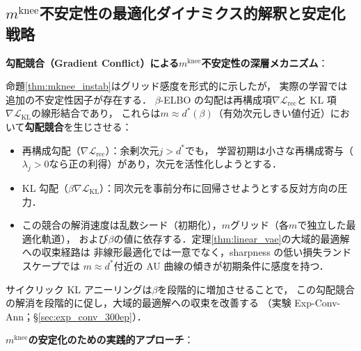 \documentclass[11pt,a4paper]{jsarticle}
\newcommand{\mknee}{m^{\mathrm{knee}}}
\begin{document}
\subsection{$\mknee$不安定性の最適化ダイナミクス的解釈と安定化戦略}\label{sec:disc_mknee_improve}

\textbf{勾配競合（Gradient Conflict）による$\mknee$不安定性の深層メカニズム}：

命題\ref{thm:mknee_instab}はグリッド感度を形式的に示したが，
実際の学習では追加の不安定性因子が存在する．
$\beta$-ELBO の勾配は再構成項$\nabla\mathcal{L}_\mathrm{rec}$と
KL 項$\nabla\mathcal{L}_\mathrm{KL}$の線形結合であり，
これらは$m \approx d^*(\beta)$（有効次元しきい値付近）において\textbf{勾配競合}を生じさせる：

\begin{itemize}
  \item 再構成勾配（$\nabla\mathcal{L}_\mathrm{rec}$）：余剰次元$j > d^*$でも，
        学習初期は小さな再構成寄与（$\lambda_j > 0$なら正の利得）があり，次元を活性化しようとする．
  \item KL 勾配（$\beta\nabla\mathcal{L}_\mathrm{KL}$）：同次元を事前分布に回帰させようとする反対方向の圧力．
  \item この競合の解消速度は乱数シード（初期化），$m$グリッド（各$m$で独立した最適化軌道），
        および$\beta$の値に依存する．定理\ref{thm:linear_vae}の大域的最適解への収束経路は
        非線形最適化では一意でなく，sharpness の低い損失ランドスケープでは
        $m \approx d^*$付近の AU 曲線の傾きが初期条件に感度を持つ．
\end{itemize}

サイクリック KL アニーリング\cite{fu2019cyclical}は$\beta$を段階的に増加させることで，
この勾配競合の解消を段階的に促し，大域的最適解への収束を改善する
（実験 Exp-Conv-Ann；§\ref{sec:exp_conv_300ep}）．

\textbf{$\mknee$の安定化のための実践的アプローチ}：
\end{document}

